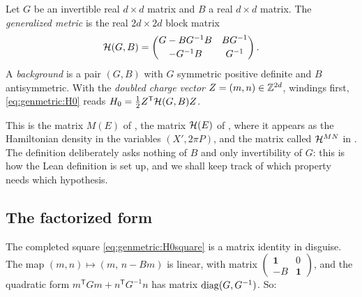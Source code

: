 \begin{definition}\label{def:genmetric:H}
Let $G$ be an invertible real $d\times d$ matrix and $B$ a real $d\times d$ matrix. The
\emph{generalized metric} is the real $2d\times2d$ block matrix
\begin{equation}\label{eq:genmetric:H}
 \mathcal{H}(G,B)=\begin{pmatrix}G-BG^{-1}B&BG^{-1}\\[2pt]-G^{-1}B&G^{-1}\end{pmatrix}.
\end{equation}
A \emph{background} is a pair $(G,B)$ with $G$ symmetric positive definite and $B$
antisymmetric. With the \emph{doubled charge vector}
$Z=(m,n)\in\mathbb{Z}^{2d}$, windings first, \eqref{eq:genmetric:H0} reads
$H_0=\tfrac12Z^{\mathsf T}\mathcal{H}(G,B)Z$.
\end{definition}
\noindent This is the matrix $M(E)$ of , the matrix $\mathcal{H}(E)$ of , where it
appears as the Hamiltonian density in the variables $(X',2\pi P)$, and the matrix called
$\mathcal{H}^{MN}$ in . The definition deliberately asks
nothing of $B$ and only invertibility of $G$: this is how the Lean definition
 is set up, and we shall keep track of which property needs which
hypothesis.

\subsection{The factorized form}

The completed square \eqref{eq:genmetric:H0square} is a matrix identity in disguise. The
map $(m,n)\mapsto(m,\,n-Bm)$ is linear, with matrix $\left(\begin{smallmatrix}\mathbf 1&0\\
-B&\mathbf 1\end{smallmatrix}\right)$, and the quadratic form
$m^{\mathsf T}Gm+n^{\mathsf T}G^{-1}n$ has matrix $\operatorname{diag}(G,G^{-1})$. So:

